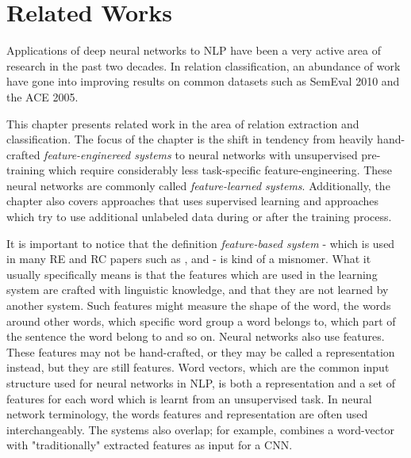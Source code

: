 
\chapter{Related Works}
\label{related_works}

Applications of deep neural networks to NLP have been a very active area of research in the past two decades. In relation classification, an abundance of work have gone into improving results on common datasets such as SemEval 2010 and the ACE 2005. 

This chapter presents related work in the area of relation extraction and classification. The focus of the chapter is the shift in tendency from heavily hand-crafted \emph{feature-enginereed systems} to neural networks with unsupervised pre-training which require considerably less task-specific feature-engineering. These neural networks are commonly called \emph{feature-learned systems}. Additionally, the chapter also covers approaches that uses supervised learning and approaches which try to use additional unlabeled data during or after the training process.  

It is important to notice that the definition \emph{feature-based system} -  which is used in many RE and RC papers such as \cite{re_cnn}, \cite{re_survey} and \cite{re_lstm} - is kind of a misnomer. What it usually specifically means is that the features which are used in the learning system are crafted with linguistic knowledge, and that they are not learned by another system. Such features might measure the shape of the word, the words around other words, which specific word group a word belongs to, which part of the sentence the word belong to and so on. Neural networks also use features. These features may not be hand-crafted, or they may be called a representation instead, but they are still features. Word vectors, which are the common input structure used for neural networks in NLP, is both a representation and a set of features for each word which is learnt from an unsupervised task. In neural network terminology, the words features and representation are often used interchangeably. The systems also overlap; for example, \cite{zeng2014} combines a word-vector with "traditionally" extracted features as input for a CNN.


 



